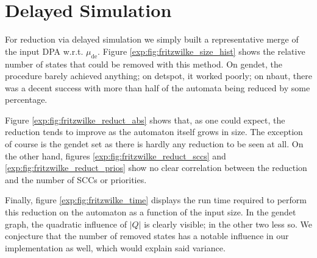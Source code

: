 
\section{Delayed Simulation}
For reduction via delayed simulation we simply built a representative merge of the input DPA w.r.t. $\mu_\text{de}$. Figure \ref{exp:fig:fritzwilke_size_hist} shows the relative number of states that could be removed with this method. On gendet, the procedure barely achieved anything; on detspot, it worked poorly; on nbaut, there was a decent success with more than half of the automata being reduced by some percentage.

Figure \ref{exp:fig:fritzwilke_reduct_abs} shows that, as one could expect, the reduction tends to improve as the automaton itself grows in size. The exception of course is the gendet set as there is hardly any reduction to be seen at all. On the other hand, figures \ref{exp:fig:fritzwilke_reduct_sccs} and \ref{exp:fig:fritzwilke_reduct_prios} show no clear correlation between the reduction and the number of SCCs or priorities.

Finally, figure \ref{exp:fig:fritzwilke_time} displays the run time required to perform this reduction on the automaton as a function of the input size. In the gendet graph, the quadratic influence of $|Q|$ is clearly visible; in the other two less so. We conjecture that the number of removed states has a notable influence in our implementation as well, which would explain said variance.


